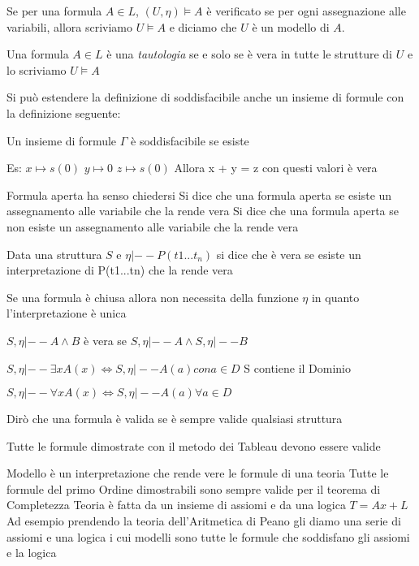 \begin{defi}
    Se per una formula $A \in L$, $(U,\eta) \models A$ è verificato se per ogni
    assegnazione alle variabili, allora scriviamo $U \models A$ e diciamo che $U$
    è un modello di $A$.
\end{defi}

\begin{defi}
Una formula $A \in L$ è una \emph{tautologia} se e solo se è vera in tutte le strutture
di $U$ e lo scriviamo $U \models A$
\end{defi}

Si può estendere la definizione di soddisfacibile anche un insieme di formule con
la definizione seguente:
\begin{defi}
Un insieme di formule $\Gamma$ è soddisfacibile se esiste
\end{defi}

Es:
$x \mapsto s(0)$
$y \mapsto 0$
$z \mapsto s(0)$
Allora x + y = z con questi valori è vera

Formula aperta ha senso chiedersi
Si dice che una formula aperta    se esiste un assegnamento alle variabile che la rende vera
Si dice che una formula aperta se non esiste un assegnamento alle variabile che la rende vera

Data una struttura $S $ e $\eta |-- P(t1...t_n)$ si dice che è vera se esiste un interpretazione di P(t1...tn) che la rende vera

Se una formula è chiusa allora non necessita della funzione $\eta$ in quanto l'interpretazione è unica

$S,\eta |-- A \land B$ è vera se $S,\eta |-- A \land S,\eta |-- B$

$S,\eta |-- \exists x A(x) \iff S,\eta |-- A(a) con a \in D$  S contiene il Dominio

$S,\eta |-- \forall x A(x) \iff S,\eta |-- A(a) \forall a \in D$

Dirò che una formula è valida se è sempre valide qualsiasi struttura

Tutte le formule dimostrate con il metodo dei Tableau devono essere valide

Modello è un interpretazione che rende vere le formule di una teoria
Tutte le formule del primo Ordine dimostrabili sono sempre valide per il teorema di Completezza
Teoria è fatta da un insieme di assiomi e da una logica $T = Ax + L$
Ad esempio prendendo la teoria dell'Aritmetica di Peano gli diamo una serie di assiomi e una logica
i cui modelli sono tutte le formule che soddisfano gli assiomi e la logica

